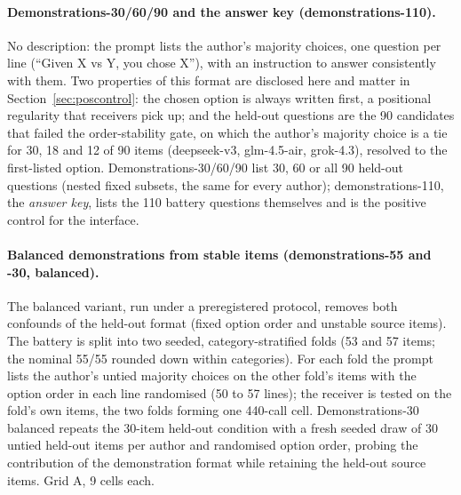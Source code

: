 \documentclass[11pt]{article}
\begin{document}
\paragraph{Demonstrations-30/60/90 and the answer key (demonstrations-110).}
No description: the prompt lists the author's majority choices, one question
per line (``Given X vs Y, you chose X''), with an instruction to answer
consistently with them. Two properties of this format are disclosed here and
matter in Section~\ref{sec:poscontrol}: the chosen option is always written
first, a positional regularity that receivers pick up; and the held-out
questions are the 90 candidates that failed the order-stability gate, on
which the author's majority choice is a tie for 30, 18 and 12 of 90 items
(deepseek-v3, glm-4.5-air, grok-4.3), resolved to the first-listed option.
Demonstrations-30/60/90 list 30, 60 or all 90 held-out questions (nested
fixed subsets, the same for every author); demonstrations-110, the
\emph{answer key}, lists the 110 battery questions themselves and is the
positive control for the interface.

\paragraph{Balanced demonstrations from stable items (demonstrations-55 and
-30, balanced).} The balanced variant, run under a preregistered protocol,
removes both confounds of the held-out format (fixed option order and
unstable source items). The battery is split into two seeded, category-stratified
folds (53 and 57 items; the nominal 55/55 rounded down within categories).
For each fold the prompt lists the author's untied majority choices on the
other fold's items with the option order in each line randomised (50 to 57
lines); the receiver is tested on the fold's own items, the two folds forming
one 440-call cell. Demonstrations-30 balanced repeats the 30-item held-out
condition with a fresh seeded draw of 30 untied held-out items per author
and randomised option order, probing the
contribution of the demonstration format while retaining the held-out
source items. Grid A, 9 cells each.
\end{document}
